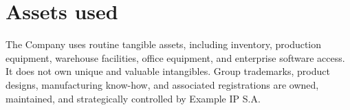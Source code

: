 \section{Assets used}
The Company uses routine tangible assets, including inventory, production
equipment, warehouse facilities, office equipment, and enterprise software
access. It does not own unique and valuable intangibles. Group trademarks,
product designs, manufacturing know-how, and associated registrations are owned,
maintained, and strategically controlled by Example IP S.A.
